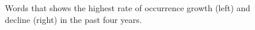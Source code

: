 \documentclass[geosciences,article,submit,moreauthors,pdftex]{Definitions/mdpi}
\begin{document}
\begin{figure}[ht!]

\begin{minipage}{0.49\linewidth}
\end{minipage}
\hfill
\begin{minipage}{0.49\linewidth}
\end{minipage}

\caption{Words that shows the highest rate of occurrence growth (left)  and decline (right) in the past four years.}
\label{sigrams}
\end{figure}
\end{document}
